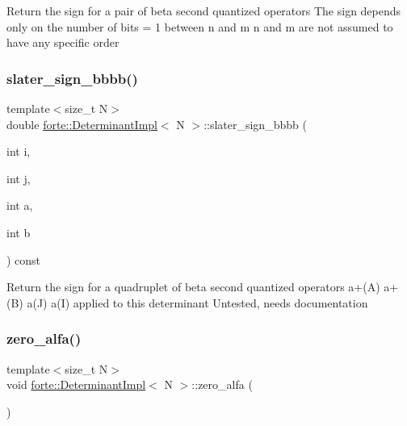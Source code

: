 Return the sign for a pair of beta second quantized operators The sign depends only on the number of bits = 1 between n and m n and m are not assumed to have any specific order \mbox{\label{classforte_1_1_determinant_impl_ac169e8423398ef5011450811c61a363b}} 
\subsubsection{\texorpdfstring{slater\+\_\+sign\+\_\+bbbb()}{slater\_sign\_bbbb()}}
{\footnotesize\ttfamily template$<$size\+\_\+t N$>$ \\
double \mbox{\hyperlink{classforte_1_1_determinant_impl}{forte\+::\+Determinant\+Impl}}$<$ N $>$\+::slater\+\_\+sign\+\_\+bbbb (\begin{DoxyParamCaption}\item[{int}]{i,  }\item[{int}]{j,  }\item[{int}]{a,  }\item[{int}]{b }\end{DoxyParamCaption}) const\hspace{0.3cm}{\ttfamily [inline]}}

Return the sign for a quadruplet of beta second quantized operators a+(A) a+(B) a(\+J) a(\+I) applied to this determinant Untested, needs documentation \mbox{\label{classforte_1_1_determinant_impl_a0c84ab17402db250ba4c64c6991a6723}} 
\subsubsection{\texorpdfstring{zero\+\_\+alfa()}{zero\_alfa()}}
{\footnotesize\ttfamily template$<$size\+\_\+t N$>$ \\
void \mbox{\hyperlink{classforte_1_1_determinant_impl}{forte\+::\+Determinant\+Impl}}$<$ N $>$\+::zero\+\_\+alfa (\begin{DoxyParamCaption}{ }\end{DoxyParamCaption})\hspace{0.3cm}{\ttfamily [inline]}}



